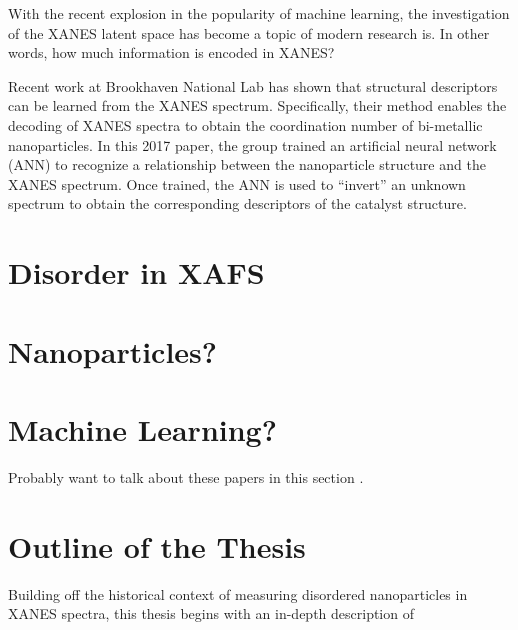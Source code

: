 With the recent explosion in the popularity of machine learning, the investigation of the XANES latent space has become a topic of modern research is. In other words, how much information is encoded in XANES?

Recent work at Brookhaven National Lab \cite{Timoshenko2017} has shown that structural descriptors can be learned from the XANES spectrum. Specifically, their method enables the decoding of XANES spectra to obtain the coordination number of bi-metallic nanoparticles. In this 2017 paper, the group trained an artificial neural network (ANN) to recognize a relationship between the nanoparticle structure and the XANES spectrum. Once trained, the ANN is used to ``invert'' an unknown spectrum to obtain the corresponding descriptors  of the catalyst structure. 

\section{Disorder in XAFS}

\section{Nanoparticles?}
\section{Machine Learning?}

Probably want to talk about these papers in this section \cite{timoshenko2018neural} \cite{Timoshenko2017}.
\section{Outline of the Thesis}
Building off the historical context of measuring disordered nanoparticles in XANES spectra, this thesis begins with an in-depth description of 
